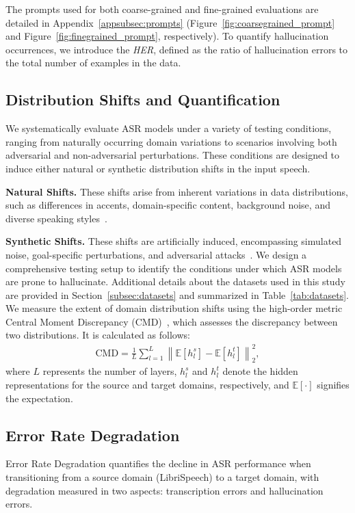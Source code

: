 The prompts used for both coarse-grained and fine-grained evaluations are detailed in Appendix~\ref{appsubsec:prompts} (Figure~\ref{fig:coarsegrained_prompt} and Figure~\ref{fig:finegrained_prompt}, respectively). To quantify hallucination occurrences, we introduce the \textit{HER}, defined as the ratio of hallucination errors to the total number of examples in the data.



\subsection{Distribution Shifts and Quantification}\label{subsec:distribution_shift_and_quantification}
We systematically evaluate ASR models under a variety of testing conditions, ranging from naturally occurring domain variations to scenarios involving both adversarial and non-adversarial perturbations. These conditions are designed to induce either natural or synthetic distribution shifts in the input speech.

\noindent\textbf{Natural Shifts.} These shifts arise from inherent variations in data distributions, such as differences in accents, domain-specific content, background noise, and diverse speaking styles~\cite{liu2021towards}.

\noindent\textbf{Synthetic Shifts.} These shifts are artificially induced, encompassing simulated noise, goal-specific perturbations, and adversarial attacks~\cite{fan2022normalization}. We design a comprehensive testing setup to identify the conditions under which ASR models are prone to hallucinate. Additional details about the datasets used in this study are provided in Section~\ref{subsec:datasets} and summarized in Table~\ref{tab:datasets}.
We measure the extent of domain distribution shifts using the high-order metric Central Moment Discrepancy (CMD)~\cite{zellinger2019centralmomentdiscrepancycmd, kashyap2020domain}, which assesses the discrepancy between two distributions. It is calculated as follows:
\begin{multline}
\text{CMD} = \frac{1}{L} \sum_{l=1}^{L} \left\| \mathbb{E}[h_l^s] - \mathbb{E}[h_l^t] \right\|_2^2,
\end{multline}
where \(L\) represents the number of layers, \(h_l^s\) and \(h_l^t\) denote the hidden representations for the source and target domains, respectively, and \(\mathbb{E}[\cdot]\) signifies the expectation.


\subsection{Error Rate Degradation}
Error Rate Degradation quantifies the decline in ASR performance when transitioning from a source domain (LibriSpeech) to a target domain, with degradation measured in two aspects: transcription errors and hallucination errors.

